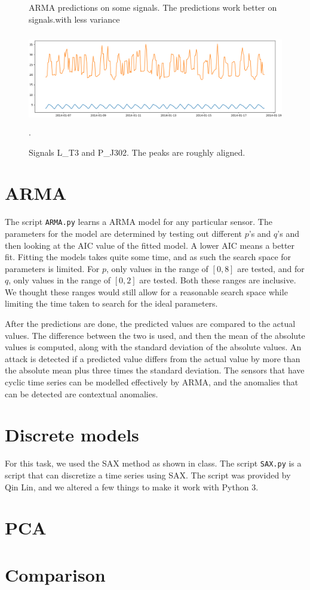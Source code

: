 \documentclass[]{article}
\begin{document}
\begin{figure}[H]
\begin{minipage}{.5\textwidth}
   \caption{ARMA predictions on some signals. The predictions work better on signals.with less variance}
  \label{predictions}
\end{minipage}
\begin{minipage}{.5\textwidth}
  \includegraphics[width=2\linewidth, height=4cm]{./visuallizations/correlated_signals.png}.
  \label{correlation}
  \caption{Signals L\_T3 and P\_J302. The peaks are roughly aligned.}
\end{minipage}%
\end{figure}
\clearpage
\section{ARMA}
The script \texttt{ARMA.py} learns a ARMA model for any particular sensor. The parameters for the model are determined by testing out different $p$'s and $q$'s and then looking at the AIC value of the fitted model. A lower AIC means a better fit. Fitting the models takes quite some time, and as such the search space for parameters is limited. For $p$, only values in the range of $[0, 8]$ are tested, and for $q$, only values in the range of $[0, 2]$ are tested. Both these ranges are inclusive. We thought these ranges would still allow for a reasonable search space while limiting the time taken to search for the ideal parameters.

After the predictions are done, the predicted values are compared to the actual values. The difference between the two is used, and then the mean of the absolute values is computed, along with the standard deviation of the absolute values. An attack is detected if a predicted value differs from the actual value by more than the absolute mean plus three times the standard deviation. The sensors that have cyclic time series can be modelled effectively by ARMA, and the anomalies that can be detected are contextual anomalies.
\section{Discrete models}
For this task, we used the SAX method as shown in class. The script \texttt{SAX.py} is a script that can discretize a time series using SAX. The script was provided by Qin Lin, and we altered a few things to make it work with Python 3.
\section{PCA}
\section{Comparison} 
\end{document}
